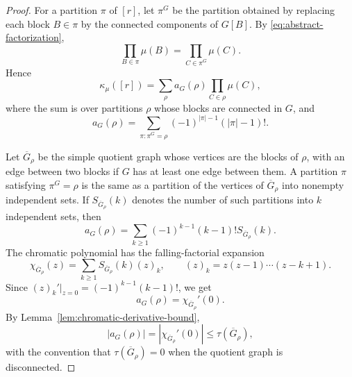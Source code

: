 \documentclass[11pt]{article}
\begin{document}
\begin{proof}
  For a partition $\pi$ of $[r]$, let $\pi^G$ be the partition obtained by
  replacing each block $B\in\pi$ by the connected components of $G[B]$.
  By \eqref{eq:abstract-factorization},
  \begin{equation}\label{eq:regroup-factorization}
    \prod_{B\in\pi}\mu(B)
    =
    \prod_{C\in\pi^G}\mu(C).
  \end{equation}
  Hence
  \begin{equation}\label{eq:cumulant-regrouped}
    \kappa_\mu([r])
    =
    \sum_{\rho}
    a_G(\rho)
    \prod_{C\in\rho}\mu(C),
  \end{equation}
  where the sum is over partitions $\rho$ whose blocks are connected in $G$, and
  \begin{equation}\label{eq:aG-rho-def}
    a_G(\rho)
    =
    \sum_{\pi:\pi^G=\rho}
    (-1)^{|\pi|-1}(|\pi|-1)!.
  \end{equation}

  Let $\overline G_\rho$ be the simple quotient graph whose vertices are the
  blocks of $\rho$, with an edge between two blocks if $G$ has at least one edge
  between them.  A partition $\pi$ satisfying $\pi^G=\rho$ is the same as a
  partition of the vertices of $\overline G_\rho$ into nonempty independent
  sets.  If $S_{\overline G_\rho}(k)$ denotes the number of such partitions into
  $k$ independent sets, then
  \begin{equation}\label{eq:aG-rho-independent}
    a_G(\rho)
    =
    \sum_{k\geq1}
    (-1)^{k-1}(k-1)!S_{\overline G_\rho}(k).
  \end{equation}
  The chromatic polynomial has the falling-factorial expansion
  \begin{equation}\label{eq:chromatic-falling-factorial}
    \chi_{\overline G_\rho}(z)
    =
    \sum_{k\geq1}
    S_{\overline G_\rho}(k)(z)_k,
    \qquad
    (z)_k=z(z-1)\cdots(z-k+1).
  \end{equation}
  Since $(z)_k'|_{z=0}=(-1)^{k-1}(k-1)!$, we get
  \begin{equation}\label{eq:aG-rho-chromatic}
    a_G(\rho)=\chi_{\overline G_\rho}'(0).
  \end{equation}
  By Lemma~\ref{lem:chromatic-derivative-bound},
  \begin{equation}\label{eq:chromatic-derivative-tree}
    |a_G(\rho)|
    =
    |\chi_{\overline G_\rho}'(0)|
    \leq
    \tau(\overline G_\rho),
  \end{equation}
  with the convention that $\tau(\overline G_\rho)=0$ when the quotient graph is
  disconnected.


\end{proof}
\end{document}

